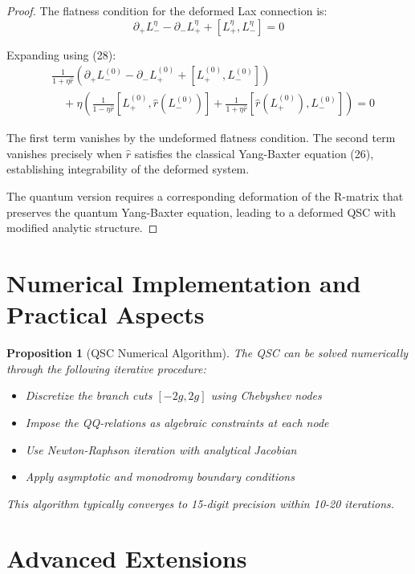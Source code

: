 \documentclass[11pt]{article}
\newtheorem{proposition}{Proposition}
\begin{document}
\begin{proof}
The flatness condition for the deformed Lax connection is:
\begin{equation}
\partial_+ L_-^{\eta} - \partial_- L_+^{\eta} + [L_+^{\eta}, L_-^{\eta}] = 0
\end{equation}

Expanding using (28):
\begin{align}
&\frac{1}{1 + \eta \hat{r}} \left( \partial_+ L_-^{(0)} - \partial_- L_+^{(0)} + [L_+^{(0)}, L_-^{(0)}] \right) \\
&\quad + \eta \left( \frac{1}{1 - \eta \hat{r}} [L_+^{(0)}, \hat{r}(L_-^{(0)})] + \frac{1}{1 + \eta \hat{r}} [\hat{r}(L_+^{(0)}), L_-^{(0)}] \right) = 0
\end{align}

The first term vanishes by the undeformed flatness condition. The second term vanishes precisely when $\hat{r}$ satisfies the classical Yang-Baxter equation (26), establishing integrability of the deformed system.

The quantum version requires a corresponding deformation of the R-matrix that preserves the quantum Yang-Baxter equation, leading to a deformed QSC with modified analytic structure.
\end{proof}

\section{Numerical Implementation and Practical Aspects}

\begin{proposition}[QSC Numerical Algorithm]
The QSC can be solved numerically through the following iterative procedure:
\begin{itemize}
\item[1.] Discretize the branch cuts $[-2g, 2g]$ using Chebyshev nodes
\item[2.] Impose the QQ-relations as algebraic constraints at each node
\item[3.] Use Newton-Raphson iteration with analytical Jacobian
\item[4.] Apply asymptotic and monodromy boundary conditions
\end{itemize}
This algorithm typically converges to 15-digit precision within 10-20 iterations.
\end{proposition}

\section{Advanced Extensions}
\end{document}
